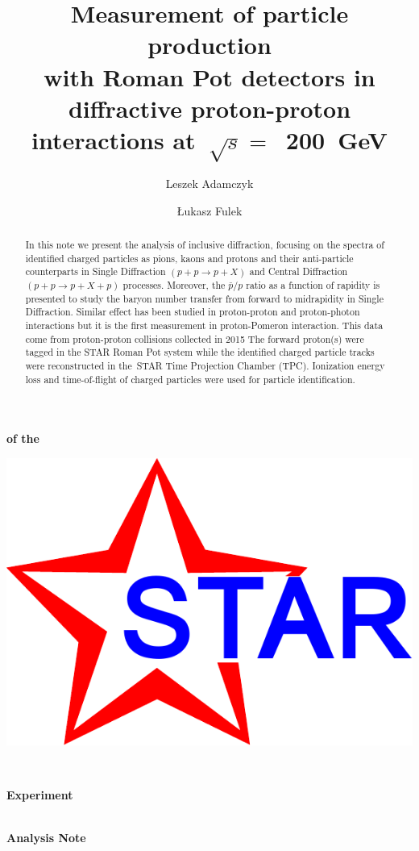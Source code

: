 \documentclass[a4paper,10pt,notitlepage]{report}
\title{\textbf{Measurement of particle production\\with Roman Pot detectors in diffractive proton-proton interactions at~$\sqrt{s}=$~200~GeV}\vspace*{10pt}}
\author[1]{Leszek Adamczyk}
\author[1]{Łukasz Fulek}
\affil[1]{AGH University of Science and Technology, Kraków, Poland}
\begin{document}
\begin{center}
\begin{minipage}[c]{0.12\linewidth}%
\vspace{5.5pt}\textbf{\LARGE{of the}}
\end{minipage}
\begin{minipage}[c]{0.15\linewidth}%
\hspace*{-8pt}\includegraphics[width=\linewidth]{graphics/STAR_logo.pdf}
\end{minipage}~
\begin{minipage}[c]{0.24\linewidth}%
\vspace{9pt}\hspace*{-8pt}\textbf{\LARGE{Experiment}}
\end{minipage}\\[-50pt]
\textbf{\LARGE{Analysis Note}}

\vspace*{150pt}
\begin{minipage}{\linewidth}
\maketitle
\begin{abstract}
In this note we present the analysis of inclusive diffraction, focusing on the spectra of identified charged particles as pions, kaons and protons and their anti-particle counterparts in Single Diffraction $\left(p+p\to p+X\right)$ and Central Diffraction $\left(p+p\to p+X+p \right)$ processes.  Moreover, the $\bar{p}/p$ ratio as a function of rapidity is presented
to study the baryon number transfer from forward to midrapidity
in Single Diffraction. Similar effect has been studied in proton-proton and proton-photon interactions but it is the first measurement in proton-Pomeron interaction.
This data come from proton-proton collisions collected in 2015
The forward proton(s) were tagged in the STAR Roman Pot system while the identified charged particle tracks were reconstructed in the~STAR Time Projection Chamber (TPC). 
Ionization energy loss and time-of-flight of charged particles were used for particle identification. 


\end{abstract}
\end{minipage}
\end{center}
\end{document}
